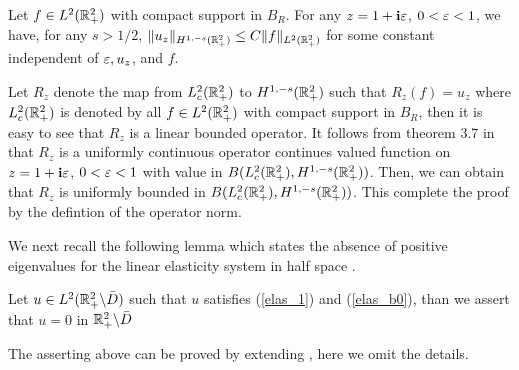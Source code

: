\documentclass[12pt]{iopart}
\begin{document}
\begin{lem}{\label{global_es}}
	Let  $ f  \in L^2 (\mathbb{R}^2_+) $ with compact support in $B_R$. For any $z=1+\mathbf{i}\varepsilon$, $0<\varepsilon<1$, we have, for any $s>1/2$,
	$\|u_z\|_{H^{1,-s}(\mathbb{R}^2_+)}\le C\|f\|_{L^2(\mathbb{R}^2_+)}$ for some constant independent of $\varepsilon, u_z$, and $f$.
\end{lem}
\debproof
Let $R_z$ denote the map from $L^2_c(\mathbb{R}^2_+)$ to $H^{1,-s}(\mathbb{R}^2_+)$ such that $R_z(f)=u_z$ where $L^2_c(\mathbb{R}^2_+)$ is denoted by all $ f  \in L^2 (\mathbb{R}^2_+) $ with compact support in $B_R$, then it is easy to see that $R_z$ is a linear bounded operator. It follows from theorem 3.7 in \cite{Yves1988} that $R_z$ is a uniformly continuous operator continues valued function on $z=1+\mathbf{i}\varepsilon$, $0<\varepsilon<1$ with value in $B(L^2_c(\mathbb{R}^2_+),H^{1,-s}(\mathbb{R}^2_+))$. Then, we can obtain that $R_z$ is uniformly bounded in $B(L^2_c(\mathbb{R}^2_+),H^{1,-s}(\mathbb{R}^2_+))$. This complete the proof by the defintion of the operator norm.
\finproof

We next recall the following lemma which states the absence of positive eigenvalues for the linear elasticity system in half space \cite{sini2004}.
\begin{lem} \label{elas_unique}
	Let $u\in L^2(\mathbb{R}^2_+ \backslash \bar D)$ such that $u$ satisfies (\ref{elas_1}) and (\ref{elas_b0}), than we assert that $u=0$ in $\mathbb{R}^2_+ \backslash \bar D$
\end{lem}
\debproof
The asserting above can be proved by extending \cite[theorem 3.1]{sini2004}, here we omit the details.
\finproof
\end{document}
